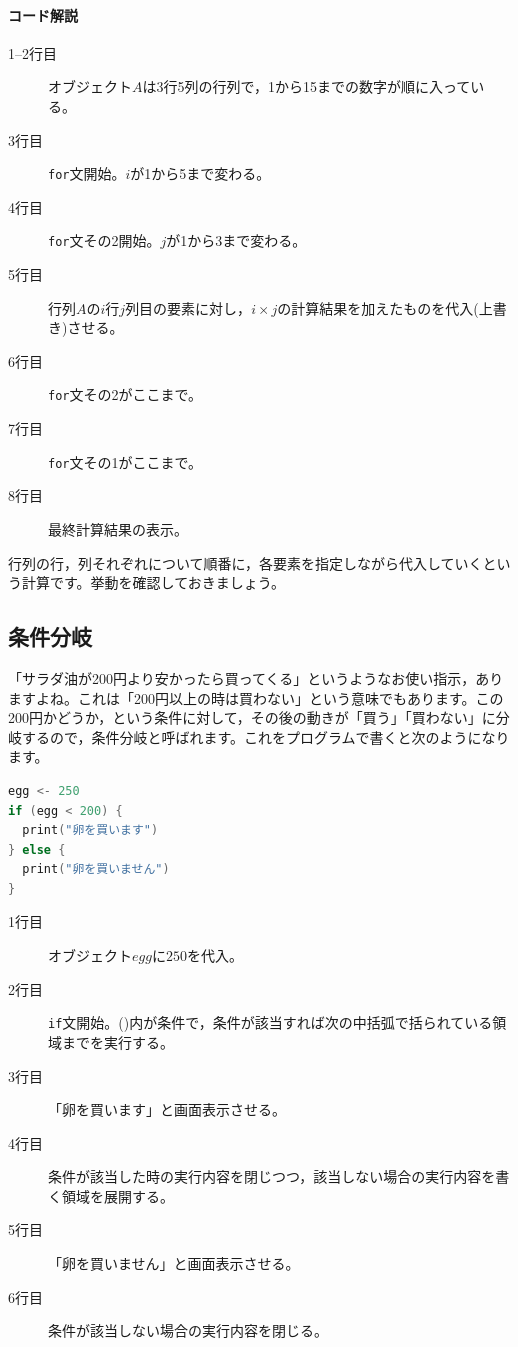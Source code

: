 \documentclass{ltjsbook}
\begin{document}
\paragraph{コード解説}
\begin{description}
        \item[1--2行目] オブジェクト$A$は3行5列の行列で，1から15までの数字が順に入っている。
        \item[3行目] \texttt{for}文開始。$i$が1から5まで変わる。
        \item[4行目] \texttt{for}文その2開始。$j$が1から3まで変わる。
        \item[5行目] 行列$A$の$i$行$j$列目の要素に対し，$i\times j$の計算結果を加えたものを代入(上書き)させる。
        \item[6行目] \texttt{for}文その2がここまで。
        \item[7行目] \texttt{for}文その1がここまで。
        \item[8行目] 最終計算結果の表示。
\end{description}

行列の行，列それぞれについて順番に，各要素を指定しながら代入していくという計算です。挙動を確認しておきましょう。

\subsection{条件分岐}
「サラダ油が200円より安かったら買ってくる」というようなお使い指示，ありますよね。これは「200円以上の時は買わない」という意味でもあります。この200円かどうか，という条件に対して，その後の動きが「買う」「買わない」に分岐するので，条件分岐と呼ばれます。これをプログラムで書くと次のようになります。
\begin{lstlisting}[language=c++,label={code::16_04},caption={条件分岐}]
egg <- 250
if (egg < 200) {
  print("卵を買います")
} else {
  print("卵を買いません")
}
\end{lstlisting}

\begin{description}
    \item[1行目] オブジェクト$egg$に$250$を代入。
    \item[2行目] \texttt{if}文開始。()内が条件で，条件が該当すれば次の中括弧で括られている領域までを実行する。
    \item[3行目] 「卵を買います」と画面表示させる。
    \item[4行目] 条件が該当した時の実行内容を閉じつつ，該当しない場合の実行内容を書く領域を展開する。
    \item[5行目] 「卵を買いません」と画面表示させる。
    \item[6行目] 条件が該当しない場合の実行内容を閉じる。
\end{description}
\end{document}
